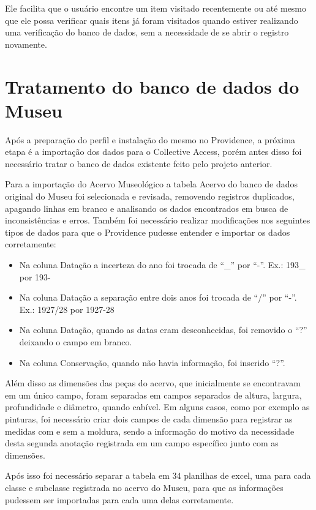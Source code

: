 \documentclass[a4paper,12pt,oneside,onecolumn,final,fleqn]{repUERJ}
\begin{document}
Ele facilita que o usuário encontre um item visitado recentemente ou até mesmo que ele possa verificar quais itens já foram visitados quando estiver realizando uma verificação do banco de dados, sem a necessidade de se abrir o registro novamente.

\section{Tratamento do banco de dados do Museu}

Após a preparação do perfil e instalação do mesmo no Providence, a próxima etapa é a importação dos dados para o Collective Access, porém antes disso foi necessário tratar o banco de dados existente feito pelo projeto anterior.

Para a importação do Acervo Museológico a tabela Acervo do banco de dados original do Museu foi selecionada e revisada, removendo registros duplicados, apagando linhas em branco e analisando os dados encontrados em busca de inconsistências e erros. Também foi necessário realizar modificações nos seguintes tipos de dados para que o Providence pudesse entender e importar os dados corretamente:

\begin{itemize}
	\item Na coluna Datação a incerteza do ano foi trocada de ``\_'' por ``-''.
	Ex.: 193\_ por 193-
	\item Na coluna Datação a separação entre dois anos foi trocada de ``/'' por ``-''. 
	Ex.: 1927/28 por 1927-28
	\item Na coluna Datação, quando as datas eram desconhecidas, foi removido o ``?'' deixando o campo em branco.
	\item Na coluna Conservação, quando não havia informação, foi inserido ``?''.
\end{itemize}

Além disso as dimensões das peças do acervo, que inicialmente se encontravam em um único campo, foram separadas em campos separados de altura, largura, profundidade e diâmetro, quando cabível. Em alguns casos, como por exemplo as pinturas, foi necessário criar dois campos de cada dimensão para registrar as medidas com e sem a moldura, sendo a informação do motivo da necessidade desta segunda anotação registrada em um campo específico junto com as dimensões.

Após isso foi necessário separar a tabela em 34 planilhas de excel, uma para cada classe e subclasse registrada no acervo do Museu, para que as informações pudessem ser importadas para cada uma delas corretamente.
\end{document}
